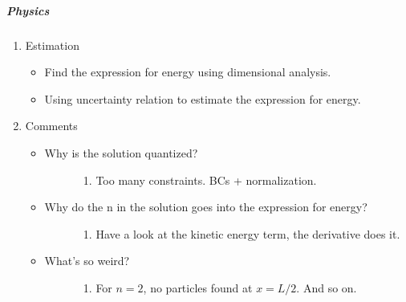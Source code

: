 \documentclass[letterpaper,10pt,english]{sphinxmanual}
\begin{document}
\subparagraph{Physics}
\label{Quantum/QuantumMechanics:physics}\begin{enumerate}
\item {} 
Estimation
\begin{itemize}
\item {} 
Find the expression for energy using dimensional analysis.

\item {} 
Using uncertainty relation to estimate the expression for energy.

\end{itemize}

\item {} 
Comments
\begin{itemize}
\item {} \begin{description}
\item[{Why is the solution quantized?}] \leavevmode\begin{enumerate}
\item {} 
Too many constraints. BCs + normalization.

\end{enumerate}

\end{description}

\item {} \begin{description}
\item[{Why do the n in the solution goes into the expression for energy?}] \leavevmode\begin{enumerate}
\item {} 
Have a look at the kinetic energy term, the derivative does it.

\end{enumerate}

\end{description}

\item {} \begin{description}
\item[{What's so weird?}] \leavevmode\begin{enumerate}
\item {} 
For \(n=2\), no particles found at \(x=L/2\). And so on.

\end{enumerate}

\end{description}

\end{itemize}

\end{enumerate}
\end{document}

